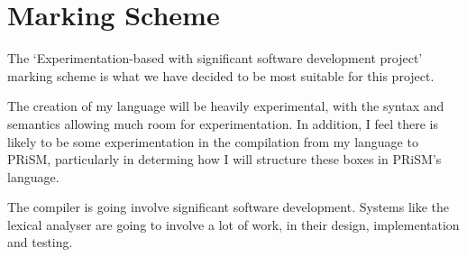 \documentclass[11pt, a4paper]{article}
\begin{document}
\section{Marking Scheme} %
\label{sec:marking_scheme}
The `Experimentation-based with significant software development project'
marking scheme is what we have decided to be most suitable for this project.

The creation of my language will be heavily experimental, with the syntax and
semantics allowing much room for experimentation. In addition, I feel there is
likely to be some experimentation in the compilation from my language to PRiSM,
particularly in determing how I will structure these boxes in PRiSM's language.

The compiler is going involve significant software development. Systems like the
lexical analyser are going to involve a lot of work, in their design,
implementation and testing.




\end{document}
